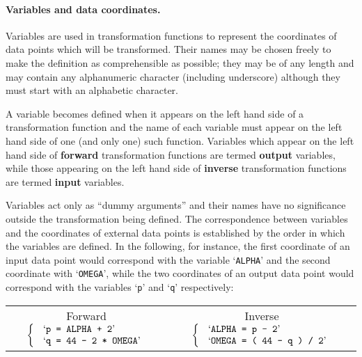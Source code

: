 \documentclass[twoside,11pt]{article}
\begin{document}
\paragraph{Variables and data coordinates.}
Variables are used in transformation functions to represent the coordinates
of data points which will be transformed.
Their names may be chosen freely to make the definition as comprehensible as
possible; they may be of any length and may contain any alphanumeric
character (including underscore) although they must start with an alphabetic
character. 

A variable becomes defined when it appears on the left hand side of a
transformation function and the name of each variable must appear on the
left hand side of one (and only one) such function. 
Variables which appear on the left hand side of \textbf{forward} transformation
functions are termed \textbf{output} variables, while those appearing on the
left hand side of \textbf{inverse} transformation functions are termed 
\textbf{input} variables. 

Variables act only as ``dummy arguments'' and their names have no
significance outside the transformation being defined. 
The correspondence between variables and the coordinates of external data
points is established by the order in which the variables are defined. 
In the following, for instance, the first coordinate of an input data point
would correspond with the variable `\verb#ALPHA#' and the second coordinate
with `\verb#OMEGA#', while the two coordinates of an output data point would
correspond with the variables `\verb#p#' and `\verb#q#' respectively: 

\begin{center}
\begin{tabular}{cc}

\mbox{Forward } $\left\{ \mbox{
\begin{tabular}{l}
`\texttt{p = ALPHA + 2}' \\
`\texttt{q = 44 - 2 * OMEGA}' \\
\end{tabular}
}\right.$
&
\mbox{Inverse } $\left\{ \mbox{
\begin{tabular}{l}
`\texttt{ALPHA = p - 2}' \\
`\texttt{OMEGA = ( 44 - q ) / 2}'
\end{tabular}
}\right.$

\end{tabular}
\end{center}
\end{document}
